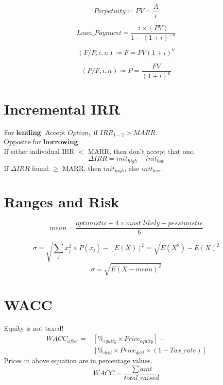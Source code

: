 \documentclass[10pt]{article}
\begin{document}
\begin{multicols*}{2}
\begin{equation*}
  Perpetuity \coloneqq PV = \frac{A}{i}
\end{equation*}

\begin{equation*}
  Loan\_Payment =  \frac{i\times (PV)}{1-{(1+i)}^{-n}}
\end{equation*}

\begin{equation*}
  (F/P, i, n) \coloneqq F = PV{(1+i)}^n
\end{equation*}

\begin{equation*}
  (P/F, i, n) \coloneqq P = \frac{FV}{{(1+i)}^n}
\end{equation*}

\section{Incremental IRR}
  For \textbf{lending}: Accept $Option_1$ if $IRR_{1-2} > MARR$.\\
  Opposite for \textbf{borrowing}.\\
  If either individual IRR $<$ MARR, then don't accept that one.
\begin{equation*}
  \Delta IRR = init_{high} - init_{low}
\end{equation*}
  If $\Delta IRR$ found $\geq$ MARR, then $init_{high}$, else $init_{low}$.

  \section{Ranges and Risk}
\begin{equation*}
  mean = \frac{optimistic + 4\times most\_likely + pessimistic}{6}
\end{equation*}

\begin{equation*}
  \sigma = \sqrt{\sum_j x_j^2 \times P(x_j) - {\left[ E(X) \right]}^2} = \sqrt{E(X^2) - {E(X)}^2}
\end{equation*}
\begin{equation*}
  \sigma = \sqrt{{E(X-mean)}^2}
\end{equation*}

\section{WACC}
Equity is not taxed!
\begin{equation*}
  \begin{split}
    WACC_{after} = &\left[\%_{equity} \times Price_{equity}\right] +\\ &\left[\%_{debt} \times Price_{debt} \times (1 - Tax\_rate) \right]
  \end{split}
\end{equation*}
Prices in above equation are in percentage values.\\

\begin{equation*}
  WACC = \frac{\sum amt}{total\_raised}
\end{equation*}

\end{multicols*}
\end{document}
